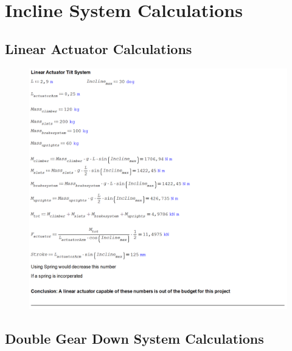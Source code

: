 \chapter{Incline System Calculations}

\section{Linear Actuator Calculations}
\label{calcs:linear-actuator}
\begin{figure}[H]
    \centering
    \includegraphics[width=1\linewidth]{chaps-append/calcs/linear_actuator_calcs.png}
\end{figure}

\section{Double Gear Down System Calculations}
\label{calcs:incline-system}

